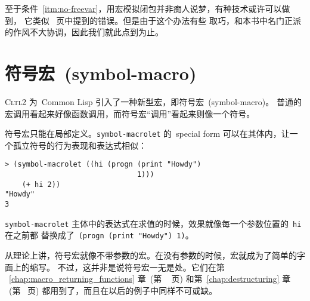 至于条件~\ref{itm:no-freevar}，用宏模拟闭包并非痴人说梦，有种技术或许可以做到，
它类似~\pageref{fun:exclaim:error} 页中提到的错误。但是由于这个办法有些
取巧，和本书中名门正派的作风不大协调，因此我们就此点到为止。

\section{符号宏~(symbol-macro)}
\label{sec:symbol_macros}

\textsc{Cltl}2 为~Common Lisp 引入了一种新型宏，即符号宏~(symbol-macro)。
普通的宏调用看起来好像函数调用，而符号宏“调用”看起来则像一个符号。

符号宏只能在局部定义。\texttt{symbol-macrolet} 的~special form 可以在其体内，让一个孤立符号的行为表现和表达式相似：
\begin{lstlisting}
> (symbol-macrolet ((hi (progn (print "Howdy")
                               1)))
    (+ hi 2))
"Howdy"
3
\end{lstlisting}
\texttt{symbol-macrolet} 主体中的表达式在求值的时候，效果就像每一个参数位置的~\texttt{hi} 在之前都
替换成了~\texttt{(progn (print "Howdy") 1)}。

从理论上讲，符号宏就像不带参数的宏。在没有参数的时候，宏就成为了简单的字面上的缩写。
不过，这并非是说符号宏一无是处。它们在第
~\ref{chap:macro_returning_functions} 章~(第
~\pageref{chap:macro_returning_functions} 页) 和第~\ref{chap:destructuring} 章
~(第~\pageref{chap:destructuring} 页) 都用到了，而且在以后的例子中同样不可或缺。

